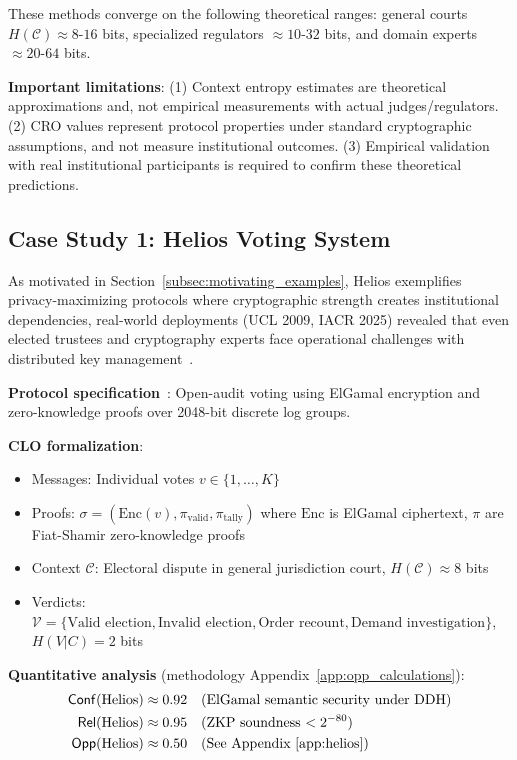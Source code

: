 \documentclass{ieeeaccess}
\begin{document}
These methods converge on the following theoretical ranges: general courts $H(\mathcal{C}) \approx 8$-$16$ bits, specialized regulators $\approx 10$-$32$ bits, and domain experts $\approx 20$-$64$ bits.

\textbf{Important limitations}: (1) Context entropy estimates are theoretical approximations and, not empirical measurements with actual judges/regulators. (2) CRO values represent protocol properties under standard cryptographic assumptions, and not measure institutional outcomes. (3) Empirical validation with real institutional participants is required to confirm these theoretical predictions.

\subsection{Case Study 1: Helios Voting System}

As motivated in Section~\ref{subsec:motivating_examples}, Helios exemplifies privacy-maximizing protocols where cryptographic strength creates institutional dependencies, real-world deployments (UCL 2009, IACR 2025) revealed that even elected trustees and cryptography experts face operational challenges with distributed key management~\cite{Adida09UCL,IACR2025incident}.

\textbf{Protocol specification}~\cite{Adida08}: Open-audit voting using ElGamal encryption and zero-knowledge proofs over 2048-bit discrete log groups.

\textbf{CLO formalization}:
\begin{itemize}
\item Messages: Individual votes $v \in \{1,\ldots,K\}$
\item Proofs: $\sigma = (\text{Enc}(v), \pi_{\text{valid}}, \pi_{\text{tally}})$ where $\text{Enc}$ is ElGamal ciphertext, $\pi$ are Fiat-Shamir zero-knowledge proofs
\item Context $\mathcal{C}$: Electoral dispute in general jurisdiction court, $H(\mathcal{C}) \approx 8$ bits
\item Verdicts: $\mathcal{V} = \{\text{Valid election}, \text{Invalid election}, \text{Order recount}, \text{Demand investigation}\}$, $H(V|C) = 2$ bits
\end{itemize}

\textbf{Quantitative analysis} (methodology Appendix~\ref{app:opp_calculations}):
\begin{align}
\mathsf{Conf}(\text{Helios}) &\approx 0.92 \quad \text{(ElGamal semantic security under DDH)} \\
\mathsf{Rel}(\text{Helios}) &\approx 0.95 \quad \text{(ZKP soundness $< 2^{-80}$)} \\
\mathsf{Opp}(\text{Helios}) &\approx 0.50 \quad \text{(See Appendix~\ref{app:helios})}
\end{align}
\end{document}
